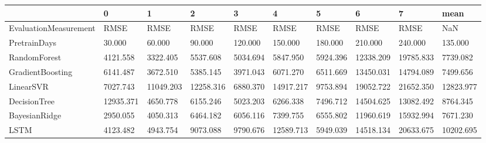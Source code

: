 \begin{tabular}{llllllllll}
\toprule
{} &         0 &         1 &         2 &        3 &         4 &        5 &         6 &         7 &      mean \\
\midrule
EvaluationMeasurement &      RMSE &      RMSE &      RMSE &     RMSE &      RMSE &     RMSE &      RMSE &      RMSE &       NaN \\
PretrainDays          &    30.000 &    60.000 &    90.000 &  120.000 &   150.000 &  180.000 &   210.000 &   240.000 &   135.000 \\
RandomForest          &  4121.558 &  3322.405 &  5537.608 & 5034.694 &  5847.950 & 5924.396 & 12338.209 & 19785.833 &  7739.082 \\
GradientBoosting      &  6141.487 &  3672.510 &  5385.145 & 3971.043 &  6071.270 & 6511.669 & 13450.031 & 14794.089 &  7499.656 \\
LinearSVR             &  7027.743 & 11049.203 & 12258.316 & 6880.370 & 14917.217 & 9753.894 & 19052.722 & 21652.350 & 12823.977 \\
DecisionTree          & 12935.371 &  4650.778 &  6155.246 & 5023.203 &  6266.338 & 7496.712 & 14504.625 & 13082.492 &  8764.345 \\
BayesianRidge         &  2950.055 &  4050.313 &  6464.182 & 6056.116 &  7399.755 & 6555.802 & 11960.619 & 15932.994 &  7671.230 \\
LSTM                  &  4123.482 &  4943.754 &  9073.088 & 9790.676 & 12589.713 & 5949.039 & 14518.134 & 20633.675 & 10202.695 \\
\bottomrule
\end{tabular}
